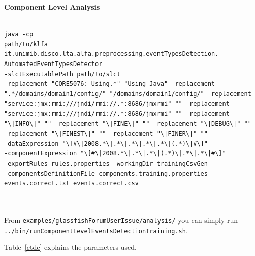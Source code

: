 \textbf{Component Level Analysis}



\begin{verbatim}

java -cp
path/to/klfa
it.unimib.disco.lta.alfa.preprocessing.eventTypesDetection.
AutomatedEventTypesDetector
-slctExecutablePath path/to/slct
-replacement "CORE5076: Using.*" "Using Java" -replacement
".*/domains/domain1/config/" "/domains/domain1/config/" -replacement
"service:jmx:rmi:///jndi/rmi://.*:8686/jmxrmi" "" -replacement
"service:jmx:rmi:///jndi/rmi://.*:8686/jmxrmi" "" -replacement
"\|INFO\|" "" -replacement "\|FINE\|" "" -replacement "\|DEBUG\|" ""
-replacement "\|FINEST\|" "" -replacement "\|FINER\|" ""
-dataExpression "\[#\|2008.*\|.*\|.*\|.*\|.*\|(.*)\|#\]"
-componentExpression "\[#\|2008.*\|.*\|.*\|(.*)\|.*\|.*\|#\]"
-exportRules rules.properties -workingDir trainingCsvGen
-componentsDefinitionFile components.training.properties
events.correct.txt events.correct.csv



\end{verbatim}

From \texttt{examples/glassfishForumUserIssue/analysis/} you can simply run
\texttt{../bin/runComponentLevelEventsDetectionTraining.sh}.

Table~\ref{etdc} explains the parameters used.


